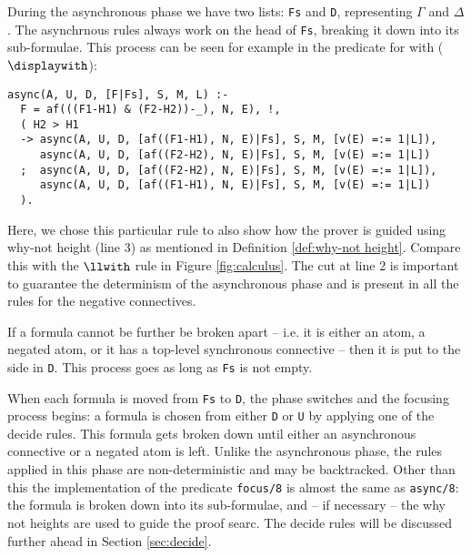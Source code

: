 During the asynchronous phase we have two lists: \texttt{Fs} and \texttt{D}, representing $\Gamma$ and $\Delta$.
The asynchrnous rules always work on the head of \texttt{Fs}, breaking it down into its sub-formulae.
This process can be seen for example in the predicate for with ($\displaywith$):
\begin{verbatim}
async(A, U, D, [F|Fs], S, M, L) :-
  F = af(((F1-H1) & (F2-H2))-_), N, E), !,
  ( H2 > H1	
  -> async(A, U, D, [af((F1-H1), N, E)|Fs], S, M, [v(E) =:= 1|L]), 
     async(A, U, D, [af((F2-H2), N, E)|Fs], S, M, [v(E) =:= 1|L]) 
  ;  async(A, U, D, [af((F2-H2), N, E)|Fs], S, M, [v(E) =:= 1|L]),
     async(A, U, D, [af((F1-H1), N, E)|Fs], S, M, [v(E) =:= 1|L])
  ).
\end{verbatim}
Here, we chose this particular rule to also show how the prover is guided using why-not height (line 3) as mentioned in Definition \ref{def:why-not height}.
Compare this with the $\llwith$ rule in Figure \ref{fig:calculus}.
The cut at line 2 is important to guarantee the determinism of the asynchronous phase and is present in all the rules for the negative connectives.

If a formula cannot be further be broken apart -- i.e. it is either an atom, a negated atom, or it has a top-level synchronous connective -- then it is put to the side in \texttt{D}.
This process goes as long as \texttt{Fs} is not empty.

When each formula is moved from \texttt{Fs} to \texttt{D}, the phase switches and the focusing process begins: a formula is chosen from either \texttt{D} or \texttt{U} by applying one of the decide rules.
This formula gets broken down until either an asynchronous connective or a negated atom is left. 
Unlike the asynchronous phase, the rules applied in this phase are non-deterministic and may be backtracked.
Other than this the implementation of the predicate \texttt{focus/8} is almost the same as \texttt{async/8}: the formula is broken down into its sub-formulae, and -- if necessary -- the why not heights are used to guide the proof searc.
The decide rules will be discussed further ahead in Section \ref{sec:decide}.

